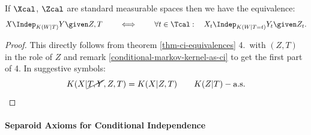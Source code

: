 
\begin{Cor}
If $\Xcal$, $\Zcal$ are standard measurable spaces
then we have the equivalence:
\[ X \Indep_{K(W|T)} Y \given Z,T \qquad \iff \qquad \forall t \in \Tcal:\quad X_t \Indep_{K(W|T=t)} Y_t \given Z_t.\]
\begin{proof}
    This directly follows from theorem \ref{thm-ci-equivalences} 4.\ with $(Z,T)$ in the role of $Z$ 
    and remark \ref{conditional-markov-kernel-as-ci} to get the first part of 4.
    In suggestive symbols:
    \[ K(X|\cancel{T,Y},Z,T) = K(X|Z,T) \qquad K(Z|T)-\text{a.s.}\]
\end{proof}
\end{Cor}




\paragraph{Separoid Axioms for Conditional Independence}

